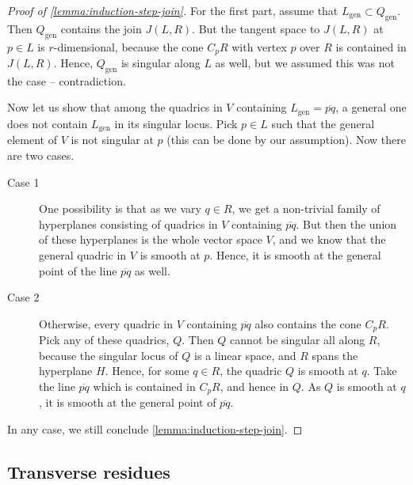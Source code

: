\documentclass[11pt, two side, letterpaper, final]{amsart}
\begin{document}
\begin{proof}[Proof of \cref{lemma:induction-step-join}]
For the first part, assume that $L_\text{gen}\subset Q_\text{gen}$. Then $Q_\text{gen}$ contains 
the join $J(L,R)$. But the tangent space to $J(L,R)$ at $p \in L$
is $r$-dimensional, because the cone $C_{p}R$ with vertex $p$ over $R$ is contained in
$J(L,R)$. Hence, $Q_\text{gen}$ is singular along $L$ as well, but we assumed this was not the case -- contradiction.

Now let us show that among the quadrics in $V$ containing $L_\text{gen}=\overline{pq}$, a general
one does not contain $L_\text{gen}$ in its singular locus. Pick $p \in L$ such that 
the general element of $V$ is not singular at $p$ (this can be done by our assumption). Now there are two cases.
\begin{description}
\item[Case 1] One possibility is that as we vary $q\in R$, we get a non-trivial family of
hyperplanes consisting of quadrics in $V$ containing $\overline{pq}$. But then the union of these hyperplanes
is the whole vector space $V$, and we know that the general quadric in $V$ is smooth at $p$. Hence, it is smooth
at the general point of the line $\overline{pq}$ as well.

\item[Case 2] Otherwise, every quadric in $V$ containing $\overline{pq}$ also contains the cone $C_pR$. 
Pick any of these quadrics, $Q$. Then $Q$ cannot be singular all along $R$, because the
singular locus of $Q$ is a linear space, and $R$ spans the hyperplane $H$. Hence, for some
$q \in R$, the quadric $Q$ is smooth at $q$. Take the line $\overline{pq}$  which is contained in $C_{p}R$, and hence in $Q$. As $Q$ is smooth at $q$, it is smooth at the general point of 
$\overline{pq}$.
\end{description}
In any case, we still conclude \cref{lemma:induction-step-join}.
\end{proof}

\subsection{Transverse residues} \label{sub:transverse_residues}

\newcommand{\Xright}{X_{\text{right}}}
\newcommand{\Hright}{H_{\text{right}}}
\newcommand{\Lambdaright}{\Lambda_{\text{right}}}

\newcommand{\Hleft}{H_{\text{left}}}
\newcommand{\Lambdaleft}{\Lambda_{\text{left}}}
\newcommand{\Xleft}{X_{\text{left}}}
\end{document}

